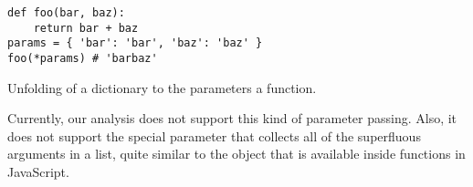 \begin{listing}[H]
	\begin{verbatim}
def foo(bar, baz):
	return bar + baz
params = { 'bar': 'bar', 'baz': 'baz' }
foo(*params) # 'barbaz'
	\end{verbatim}
\caption{Unfolding of a dictionary to the parameters a function.}
\label{code:UnfoldDictFunctionExample}
\end{listing}

Currently, our analysis does not support this kind of parameter passing. Also, it does not support the special  parameter that collects all of the superfluous arguments in a list, quite similar to the  object that is available inside functions in JavaScript.